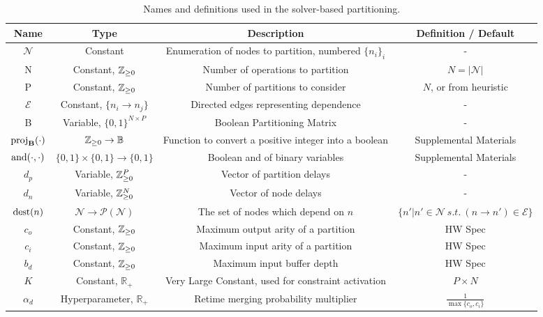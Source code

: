 \begin{table*}
  \centering
	\begin{tabular}{c | c | c | c}
		\textbf{Name} & \textbf{Type} & \textbf{Description} & \textbf{Definition / Default}\\\hline
		$\mathcal{N}$ & Constant & Enumeration of nodes to partition, numbered $\{n_i\}_i$ & - \\
		N & Constant, $\mathbb{Z}_{\ge 0}$ & Number of operations to partition & $N = |\mathcal{N}|$\\
		P & Constant, $\mathbb{Z}_{\ge 0}$ & Number of partitions to consider & $N$, or from heuristic \\
		$\mathcal{E}$ & Constant, $\{n_i \to n_j\}$& Directed edges representing dependence & - \\
		B & Variable, $\{0, 1\}^{N \times P}$ & Boolean Partitioning Matrix& - \\
		$\text{proj}_\mathbf{B}(\cdot)$ & $\mathbb{Z}_{\ge 0} \to \mathbb{B}$ & Function to convert a positive integer into a boolean& Supplemental Materials\\
		$\operatorname*{and}(\cdot, \cdot)$ & $\{0, 1\} \times \{0, 1\} \to \{0, 1\}$ & Boolean and of binary variables & Supplemental Materials \\ 
		$d_p$ & Variable, $\mathbb{Z}_{\ge 0}^P$ & Vector of partition delays & - \\
		$d_n$ & Variable, $\mathbb{Z}_{\ge 0}^N$ & Vector of node delays & - \\
		$\operatorname*{dest}(n)$ & $\mathcal{N} \to \mathcal{P}(\mathcal{N})$& The set of nodes which depend on $n$& $\{n' | n' \in \mathcal{N}\ s.t.\ (n \to n') \in \mathcal{E}\}$\\
		$c_o$ & Constant, $\mathbb{Z}_{\ge 0}$ & Maximum output arity of a partition & HW Spec \\
		$c_i$ & Constant, $\mathbb{Z}_{\ge 0}$ & Maximum input arity of a partition & HW Spec \\
		$b_d$ & Constant, $\mathbb{Z}_{\ge 0}$ & Maximum input buffer depth & HW Spec \\
		$K$ & Constant, $\mathbb{R}_+$ & Very Large Constant, used for constraint activation & $P \times N$ \\
		$\alpha_d$ & Hyperparameter, $\mathbb{R}_+$ & Retime merging probability multiplier& $\frac{1}{\max\{c_o, c_i\}}$ \\
	\end{tabular}
	\caption{Names and definitions used in the solver-based partitioning.}
	\label{tab:solver-variables}
\end{table*}

